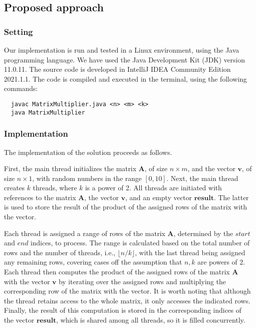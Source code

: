 \documentclass[acmlarge]{acmart}
\begin{document}
\subsection{Proposed approach}

\subsubsection{Setting}
Our implementation is run and tested in a Linux environment, using the Java programming language. We have used the Java Development Kit (JDK) version 11.0.11. The source code is developed in IntelliJ IDEA Community Edition 2021.1.1. The code is compiled and executed in the terminal, using the following commands:
\begin{verbatim}
  javac MatrixMultiplier.java <n> <m> <k>
  java MatrixMultiplier
\end{verbatim}

\subsubsection{Implementation}
The implementation of the solution proceeds as follows. 

First, the main thread initializes the matrix $\mathbf{A}$, of size $n \times m$, and the vector $\mathbf{v}$, of size $n \times 1$, with random numbers in the range $[0, 10]$. Next, the main thread creates $k$ threads, where $k$ is a power of 2. All threads are initiated with references to the matrix $\mathbf{A}$, the vector $\mathbf{v}$, and an empty vector $\mathbf{result}$. The latter is used to store the result of the product of the assigned rows of the matrix with the vector.

Each thread is assigned a range of rows of the matrix $\mathbf{A}$, determined by the $start$ and $end$ indices, to process. The range is calculated based on the total number of rows and the number of threads, i.e., $\lfloor n/k \rfloor$, with the last thread being assigned any remaining rows, covering cases off the assumption that $n,k$ are powers of 2. Each thread then computes the product of the assigned rows of the matrix $\mathbf{A}$ with the vector $\mathbf{v}$ by iterating over the assigned rows and multiplying the corresponding row of the matrix with the vector. It is worth noting that although the thread retains access to the whole matrix, it only accesses the indicated rows. Finally, the result of this computation is stored in the corresponding indices of the vector $\mathbf{result}$, which is shared among all threads, so it is filled concurrently.
\end{document}
